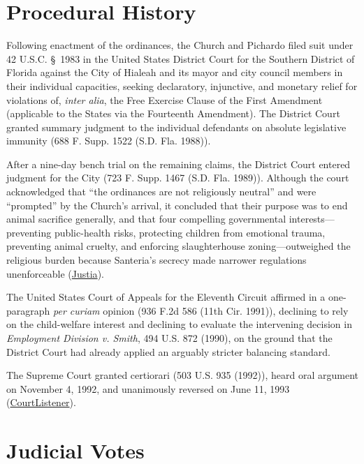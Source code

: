 \documentclass[12pt]{article}
\begin{document}
\section{Procedural History}

Following enactment of the ordinances, the Church and Pichardo filed suit under 42 U.S.C. \S~1983 in the United States District Court for the Southern District of Florida against the City of Hialeah and its mayor and city council members in their individual capacities, seeking declaratory, injunctive, and monetary relief for violations of, \textit{inter alia}, the Free Exercise Clause of the First Amendment (applicable to the States via the Fourteenth Amendment). The District Court granted summary judgment to the individual defendants on absolute legislative immunity (688 F. Supp. 1522 (S.D. Fla. 1988)).

After a nine-day bench trial on the remaining claims, the District Court entered judgment for the City (723 F. Supp. 1467 (S.D. Fla. 1989)). Although the court acknowledged that ``the ordinances are not religiously neutral'' and were ``prompted'' by the Church's arrival, it concluded that their purpose was to end animal sacrifice generally, and that four compelling governmental interests---preventing public-health risks, protecting children from emotional trauma, preventing animal cruelty, and enforcing slaughterhouse zoning---outweighed the religious burden because Santeria's secrecy made narrower regulations unenforceable (\href{https://supreme.justia.com/cases/federal/us/508/520/}{Justia}).

The United States Court of Appeals for the Eleventh Circuit affirmed in a one-paragraph \textit{per curiam} opinion (936 F.2d 586 (11th Cir. 1991)), declining to rely on the child-welfare interest and declining to evaluate the intervening decision in \textit{Employment Division v. Smith}, 494 U.S. 872 (1990), on the ground that the District Court had already applied an arguably stricter balancing standard.

The Supreme Court granted certiorari (503 U.S. 935 (1992)), heard oral argument on November 4, 1992, and unanimously reversed on June 11, 1993 (\href{https://www.courtlistener.com/opinion/112881/church-of-the-lukumi-babalu-aye-inc-v-city-of-hialeah/}{CourtListener}).

\section{Judicial Votes}
\end{document}
